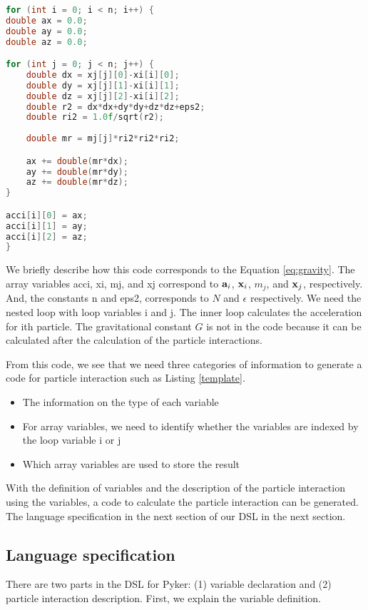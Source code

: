 \documentclass[ams]{article}
\begin{document}
\begin{lstlisting}[frame=single, caption=gravitational\_interaction.cpp, label=template,  breaklines=false, language=c++, basicstyle=\small]
              
for (int i = 0; i < n; i++) {
double ax = 0.0;
double ay = 0.0;
double az = 0.0;

for (int j = 0; j < n; j++) {
    double dx = xj[j][0]-xi[i][0];
    double dy = xj[j][1]-xi[i][1];
    double dz = xj[j][2]-xi[i][2];
    double r2 = dx*dx+dy*dy+dz*dz+eps2;
    double ri2 = 1.0f/sqrt(r2); 
    
    double mr = mj[j]*ri2*ri2*ri2;

    ax += double(mr*dx);
    ay += double(mr*dy);
    az += double(mr*dz);
}

acci[i][0] = ax;
acci[i][1] = ay;
acci[i][2] = az;
}
\end{lstlisting}

We briefly describe how this code corresponds to the Equation 
\eqref{eq:gravity}. The array variables acci, xi, mj, and xj correspond to
 $\vb{a}_i$, $\vb{x}_i$, $m_j$, and $\vb{x}_j$, respectively. And, the constants n and eps2, corresponds to $N$ and $\epsilon$
respectively. We need the nested loop with loop variables i and j. The inner loop calculates the acceleration for ith particle. The gravitational constant $G$ is not in the code because it can be calculated after the 
calculation of the particle interactions.


 From this code, we see that we need three categories of information to generate a code for particle interaction such as Listing \ref{template}.
\begin{itemize}
  \item The information on the type of each variable
  \item For array variables, we need to identify whether the variables are indexed by the loop variable i or j
  \item Which array variables are used to store the result

\end{itemize}

 With the definition of variables and the description of the
particle interaction using the variables, a code to calculate the
particle interaction can be generated.
The language specification in the next section of our DSL in the next section.


\subsection{Language specification}
There are two parts in the DSL for Pyker: (1) variable declaration and 
(2) particle interaction description.
First, we explain the variable definition.
\end{document}
